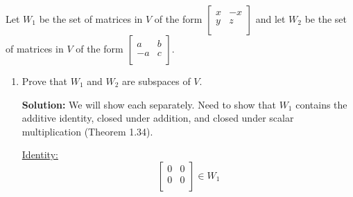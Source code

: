 \documentclass[12pt]{article}
\begin{document}
\begin{enumerate}
    Let $W_1$ be the set of matrices in $V$ of the form
    $\left[
      \begin{array}{cc}
        x & -x \\
        y & z \\
      \end{array}
    \right]$ and let $W_2$ be the set of matrices in $V$ of the form
    $\left[
      \begin{array}{cc}
        a & b \\
        -a & c \\
      \end{array}
      \right]$.
      \begin{enumerate}
      \item Prove that $W_1$ and $W_2$ are subspaces of $V$.
        \begin{mybox}
            \textbf{Solution:} We will show each separately.
            Need to show that $W_1$ contains the additive identity, closed under addition, and closed under scalar multiplication (Theorem 1.34).\vspace{0.2in}
            
            \noindent \underline{Identity:}\\
            $$\left[
              \begin{array}{cc}
                0 & 0 \\
                0 & 0 \\
              \end{array}
            \right] \in W_1$$\vspace{0.2in}
            

\end{mybox}
\end{enumerate}
\end{enumerate}
\end{document}
